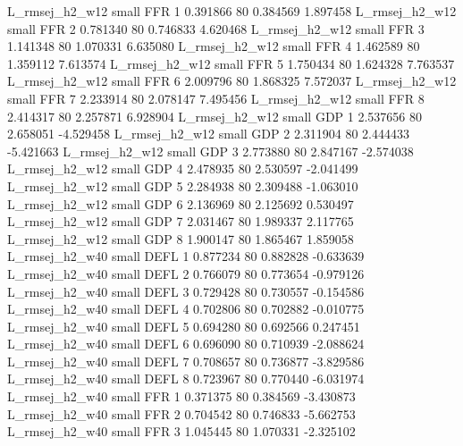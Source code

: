 L_rmsej_h2_w12      small      FFR                 1 0.391866 80       0.384569           1.897458
L_rmsej_h2_w12      small      FFR                 2 0.781340 80       0.746833           4.620468
L_rmsej_h2_w12      small      FFR                 3 1.141348 80       1.070331           6.635080
L_rmsej_h2_w12      small      FFR                 4 1.462589 80       1.359112           7.613574
L_rmsej_h2_w12      small      FFR                 5 1.750434 80       1.624328           7.763537
L_rmsej_h2_w12      small      FFR                 6 2.009796 80       1.868325           7.572037
L_rmsej_h2_w12      small      FFR                 7 2.233914 80       2.078147           7.495456
L_rmsej_h2_w12      small      FFR                 8 2.414317 80       2.257871           6.928904
L_rmsej_h2_w12      small      GDP                 1 2.537656 80       2.658051          -4.529458
L_rmsej_h2_w12      small      GDP                 2 2.311904 80       2.444433          -5.421663
L_rmsej_h2_w12      small      GDP                 3 2.773880 80       2.847167          -2.574038
L_rmsej_h2_w12      small      GDP                 4 2.478935 80       2.530597          -2.041499
L_rmsej_h2_w12      small      GDP                 5 2.284938 80       2.309488          -1.063010
L_rmsej_h2_w12      small      GDP                 6 2.136969 80       2.125692           0.530497
L_rmsej_h2_w12      small      GDP                 7 2.031467 80       1.989337           2.117765
L_rmsej_h2_w12      small      GDP                 8 1.900147 80       1.865467           1.859058
L_rmsej_h2_w40      small     DEFL                 1 0.877234 80       0.882828          -0.633639
L_rmsej_h2_w40      small     DEFL                 2 0.766079 80       0.773654          -0.979126
L_rmsej_h2_w40      small     DEFL                 3 0.729428 80       0.730557          -0.154586
L_rmsej_h2_w40      small     DEFL                 4 0.702806 80       0.702882          -0.010775
L_rmsej_h2_w40      small     DEFL                 5 0.694280 80       0.692566           0.247451
L_rmsej_h2_w40      small     DEFL                 6 0.696090 80       0.710939          -2.088624
L_rmsej_h2_w40      small     DEFL                 7 0.708657 80       0.736877          -3.829586
L_rmsej_h2_w40      small     DEFL                 8 0.723967 80       0.770440          -6.031974
L_rmsej_h2_w40      small      FFR                 1 0.371375 80       0.384569          -3.430873
L_rmsej_h2_w40      small      FFR                 2 0.704542 80       0.746833          -5.662753
L_rmsej_h2_w40      small      FFR                 3 1.045445 80       1.070331          -2.325102
